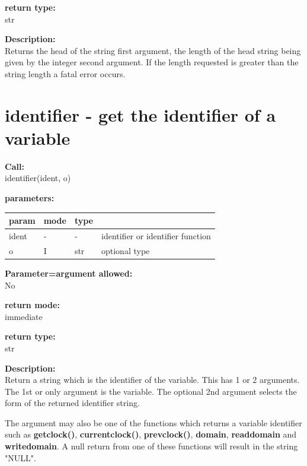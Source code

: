         {\bf return type:} \\
        str
        
        {\bf Description:} \\
        Returns the head of the string first argument, the length of the
        head string being given by the integer second argument. If the
        length requested is greater than the string length a fatal error
        occurs.


    \section{identifier - get the identifier of a variable}\label{sec:ifidentifier}
        
        {\bf Call:} \\
        identifier(ident, o)
        
        {\bf parameters:} \\
        \begin{tabular}{| l | l | l | l |}
        \hline
        param  & mode & type & \\
        \hline \hline
        ident & - &  -  & identifier or identifier function \\ \hline
        o     & I & str & optional type                     \\ \hline
        \end{tabular}
        
        {\bf Parameter=argument allowed:} \\
        No
        
        {\bf return mode:} \\
        immediate

        {\bf return type:} \\
        str
        
        {\bf Description:} \\
        Return a string which is the identifier of the variable. This has 1 or
        2 arguments. The 1st or only argument is the variable. The optional 2nd
        argument selects the form of the returned identifier string.
        
        The argument may also be one of the functions which returns a variable
        identifier such as {\bf getclock()}, {\bf currentclock()},
        {\bf prevclock()}, {\bf domain}, {\bf readdomain} and {\bf writedomain}.
        A null return from one of these functions will result in the string
        "NULL".
        
